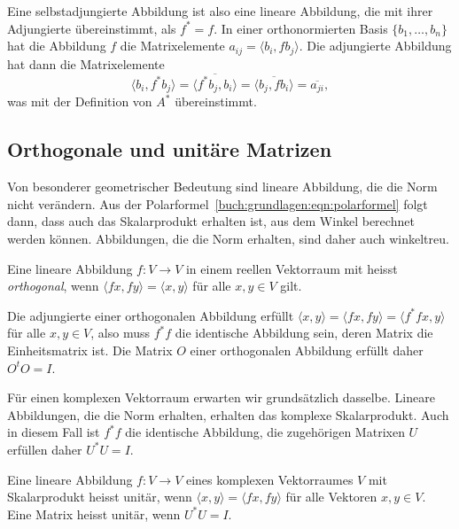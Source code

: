 Eine selbstadjungierte Abbildung ist also eine lineare Abbildung,
die mit ihrer Adjungierte übereinstimmt, als $f^* = f$.
In einer orthonormierten Basis $\{b_1,\dots,b_n\}$ hat die Abbildung
$f$ die Matrixelemente $a_{i\!j}=\langle b_i,fb_j\rangle$.
Die adjungierte Abbildung hat dann die Matrixelemente
\[
\langle b_i,f^*b_j \rangle
=
\overline{\langle f^*b_j,b_i\rangle}
=
\overline{\langle b_j,fb_i\rangle}
=
\overline{a_{ji}},
\]
was mit der Definition von $A^*$ übereinstimmt.

\subsection{Orthogonale und unitäre Matrizen
\label{buch:subsection:orthogonale-und-unitaere-matrizen}}
Von besonderer geometrischer Bedeutung sind lineare Abbildung,
die die Norm nicht verändern.
Aus der Polarformel~\eqref{buch:grundlagen:eqn:polarformel}
folgt dann, dass auch das Skalarprodukt erhalten ist, aus dem
Winkel berechnet werden können.
Abbildungen, die die Norm erhalten, sind daher auch winkeltreu.

\begin{definition}
Eine lineare Abbildung $f\colon V\to V$ in einem reellen
Vektorraum mit heisst {\em orthogonal}, wenn
$\langle fx,fy\rangle = \langle x,y\rangle$ für alle
$x,y\in V$ gilt.
%
%
\end{definition}

Die adjungierte einer orthogonalen Abbildung erfüllt
$\langle x,y\rangle = \langle fx,fy\rangle = \langle f^*f x, y\rangle$
für alle $x,y\in V$, also muss $f^*f$ die identische Abbildung sein,
deren Matrix die Einheitsmatrix ist.
Die Matrix $O$ einer orthogonalen Abbildung erfüllt daher $O^tO=I$.

Für einen komplexen Vektorraum erwarten wir grundsätzlich dasselbe.
Lineare Abbildungen, die die Norm erhalten, erhalten das komplexe
Skalarprodukt.
Auch in diesem Fall ist $f^*f$ die identische Abbildung, die zugehörigen
Matrixen $U$ erfüllen daher $U^*U=I$.

\begin{definition}
Eine lineare Abbildung $f\colon V\to V$ eines komplexen Vektorraumes
$V$ mit Skalarprodukt heisst unitär,
wenn $\langle x,y\rangle = \langle fx,fy\rangle$ für alle Vektoren $x,y\in V$.
Eine Matrix heisst unitär, wenn $U^*U=I$.
%
%
\end{definition}

